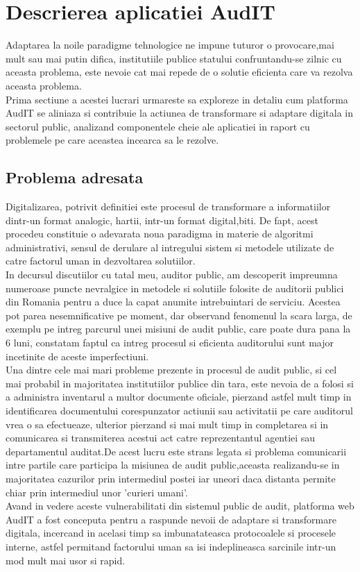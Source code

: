 \chapter{Descrierea aplicatiei AudIT}
Adaptarea la noile paradigme tehnologice ne impune tuturor o provocare,mai mult sau mai putin difica, institutiile publice statului confruntandu-se zilnic cu aceasta problema, este nevoie cat mai repede de o solutie eficienta care va rezolva aceasta problema.\\
Prima sectiune a acestei lucrari urmareste sa exploreze in detaliu cum platforma AudIT se aliniaza si contribuie la actiunea de transformare si adaptare digitala in sectorul public, analizand componentele cheie ale aplicatiei in raport cu problemele pe care aceastea incearca sa le rezolve.


\section{Problema adresata}
Digitalizarea, potrivit definitiei este procesul de transformare a informatiilor dintr-un format analogic, hartii, intr-un format digital,biti. De fapt, acest procedeu constituie o adevarata noua paradigma in materie de algoritmi administrativi, sensul de derulare al intregului sistem si metodele utilizate de catre factorul uman in dezvoltarea solutiilor.\\
In decursul discutiilor  cu tatal meu, auditor public, am descoperit impreumna numeroase 
puncte nevralgice in metodele si solutiile folosite de auditorii publici din Romania pentru a duce la capat anumite intrebuintari de serviciu. Acestea pot parea nesemnificative pe moment, dar observand fenomenul la scara larga, de exemplu pe intreg parcurul unei misiuni de audit public, care poate dura pana la 6 luni, constatam faptul ca intreg procesul si eficienta auditorului sunt major incetinite de aceste imperfectiuni.\\
Una dintre cele mai mari probleme prezente in procesul de audit public, si cel mai probabil in majoritatea institutiilor publice din tara, este nevoia de a folosi si a administra inventarul a multor documente oficiale, pierzand astfel mult timp in identificarea documentului corespunzator actiunii sau activitatii pe care auditorul vrea o sa efectueaze, ulterior pierzand si mai mult timp in completarea si in comunicarea si transmiterea acestui act catre reprezentantul agentiei sau departamentul auditat.De acest lucru este strans legata si problema comunicarii intre partile care participa la misiunea de audit public,aceasta realizandu-se in majoritatea cazurilor prin intermediul postei iar uneori daca distanta permite chiar prin intermediul unor 'curieri umani'. \\
Avand in vedere aceste vulnerabilitati din sistemul public de audit, platforma web AudIT a fost conceputa pentru a raspunde nevoii de adaptare si transformare digitala, incercand in acelasi timp sa imbunatateasca protocoalele si procesele interne, astfel permitand factorului uman sa isi indeplineasca sarcinile intr-un mod mult mai usor si rapid.

